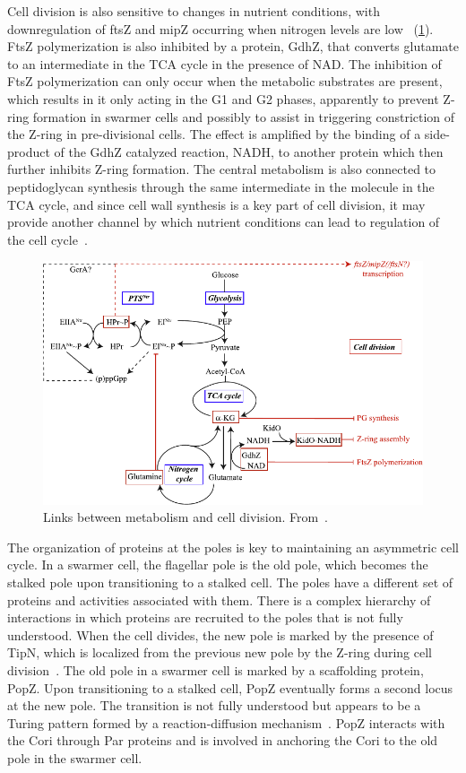 Cell division is also sensitive to changes in nutrient conditions, with downregulation of ftsZ and mipZ occurring when nitrogen levels are low~\cite{collier2019} (\cref{fig:cell-division-metabolism}).
FtsZ polymerization is also inhibited by a protein, GdhZ, that converts glutamate to an intermediate in the TCA cycle in the presence of NAD.
The inhibition of FtsZ polymerization can only occur when the metabolic substrates are present, which results in it only acting in the G1 and G2 phases, apparently to prevent Z-ring formation in swarmer cells and possibly to assist in triggering constriction of the Z-ring in pre-divisional cells.
The effect is amplified by the binding of a side-product of the GdhZ catalyzed reaction, NADH, to another protein which then further inhibits Z-ring formation.
The central metabolism is also connected to peptidoglycan synthesis through the same intermediate in the molecule in the TCA cycle, and since cell wall synthesis is a key part of cell division, it may provide another channel by which nutrient conditions can lead to regulation of the cell cycle~\cite{collier2019}.

\begin{figure}
    \centering
    \includegraphics{cell-division-metabolism}
    \caption{
        Links between metabolism and cell division.
        From~\cite{collier2019}.
        \label{fig:cell-division-metabolism}
     }
\end{figure}

The organization of proteins at the poles is key to maintaining an asymmetric cell cycle.
In a swarmer cell, the flagellar pole is the old pole, which becomes the stalked pole upon transitioning to a stalked cell.
The poles have a different set of proteins and activities associated with them.
There is a complex hierarchy of interactions in which proteins are recruited to the poles that is not fully understood.
When the cell divides, the new pole is marked by the presence of TipN, which is localized from the previous new pole by the Z-ring during cell division~\cite{lasker2016}.
The old pole in a swarmer cell is marked by a scaffolding protein, PopZ.
Upon transitioning to a stalked cell, PopZ eventually forms a second locus at the new pole.
The transition is not fully understood but appears to be a Turing pattern formed by a reaction-diffusion mechanism~\cite{subramanian2017}.
PopZ interacts with the Cori through Par proteins and is involved in anchoring the Cori to the old pole in the swarmer cell.

